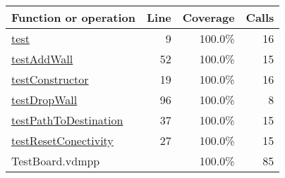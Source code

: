 \begin{longtable}{|l|r|r|r|}
\hline
Function or operation & Line & Coverage & Calls \\
\hline
\hline
\hyperref[test:9]{test} & 9&100.0\% & 16 \\
\hline
\hyperref[testAddWall:52]{testAddWall} & 52&100.0\% & 15 \\
\hline
\hyperref[testConstructor:19]{testConstructor} & 19&100.0\% & 16 \\
\hline
\hyperref[testDropWall:96]{testDropWall} & 96&100.0\% & 8 \\
\hline
\hyperref[testPathToDestination:37]{testPathToDestination} & 37&100.0\% & 15 \\
\hline
\hyperref[testResetConectivity:27]{testResetConectivity} & 27&100.0\% & 15 \\
\hline
\hline
TestBoard.vdmpp & & 100.0\% & 85 \\
\hline
\end{longtable}

